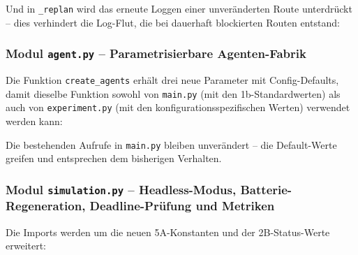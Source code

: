 

Und in \texttt{\_replan} wird das erneute Loggen einer unveränderten Route unterdrückt -- dies verhindert die Log-Flut, die bei dauerhaft blockierten Routen entstand:




\subsubsection{Modul \texttt{agent.py} – Parametrisierbare Agenten-Fabrik}

Die Funktion \texttt{create\_agents} erhält drei neue Parameter mit Config-Defaults, damit dieselbe Funktion sowohl von \texttt{main.py} (mit den 1b-Standardwerten) als auch von \texttt{experiment.py} (mit den konfigurationsspezifischen Werten) verwendet werden kann:



Die bestehenden Aufrufe in \texttt{main.py} bleiben unverändert -- die Default-Werte greifen und entsprechen dem bisherigen Verhalten.


\subsubsection{Modul \texttt{simulation.py} – Headless-Modus, Batterie-Regeneration, Deadline-Prüfung und Metriken}

Die Imports werden um die neuen 5A-Konstanten und der 2B-Status-Werte erweitert:



